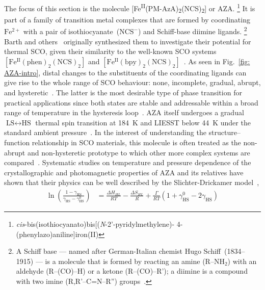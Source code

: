 The focus of this section is the molecule
[Fe\textsuperscript{II}(PM-AzA)\textsubscript{2}(NCS)\textsubscript{2}] or AZA.%
\footnote{\textit{cis}-bis(isothiocyanato)bis[(\textit{N}-2'-pyridylmethylene)-
4-(phenylazo)aniline]iron(II)}
It is part of a family of transition metal complexes
that are formed by coordinating $\mathrm{Fe^{2+}}$ with a pair of
isothiocyanate~($\mathrm{NCS^-}$) and Schiff-base diimine ligands.%
\footnote{A Schiff base --- named after German-Italian chemist Hugo Schiff~(1834--1915) ---
is a molecule that is formed by reacting an amine (R--NH$_2$) with an aldehyde (R--(CO)--H)
or a ketone (R--(CO)--R'); a diimine is a compound with two imine (R,R'--C=N--R'')
groups~\cite{Schiff1864, Halcrow2007}.}
%
Barth and others~\cite{Barth1972, Konig1974, Maeda1976} originally synthesized them
to investigate their potential for thermal SCO,
given their similarity to the well-known SCO systems $\mathrm{[Fe^{II}(phen)_2(NCS)_2]}$ and
$\mathrm{[Fe^{II}(bpy)_2(NCS)_2]}$~\cite{Baker1964}.
%
As seen in Fig.~\ref{fig: AZA-intro},
distal changes to the substituents of the coordinating ligands can give rise to
the whole range of SCO behaviour:
none, incomplete, gradual, abrupt, and hysteretic~\cite{Ksenofontov1998, Guionneau1999,
Letard1999, Capes2000}.
%
The latter is the most desirable type of phase transition for practical applications
since both states are stable and addressable within a broad range of temperature
in the hysteresis loop~\cite{Kahn1992, Kumar2017, Collet2018b}.
%
AZA itself undergoes a gradual $\text{LS} \leftrightarrow \text{HS}$ thermal spin transition
at 184~K and LIESST below 44~K under the standard ambient pressure~\cite{Letard1999, Capes2000}.
%
In the interest of understanding the structure--function relationship in SCO materials,
this molecule is often treated as the non-abrupt and non-hysteretic prototype
to which other more complex systems are compared~\cite{Boillot2002, Hayami2003,
Blundell2004, SCO-II, LeGrand2008, Kepenekian2009, Guionneau2012, Guionneau2014,
XZhang2015a, Mebs2015, Lakhloufi2016, Lakhloufi2018, Hamouda2018}.
%
Systematic studies on temperature and pressure dependence
of the crystallographic and photomagnetic properties of AZA and its relatives
have shown that their physics can be well described by the Slichter-Drickamer model~\cite{Slichter1972},
%
\begin{equation}
  \begin{aligned}
    \ln \left( \frac{1 - \gamma_\text{HS}}{\gamma_\text{HS} - \gamma_\text{HS}^0} \right)
      & = \frac{\Delta H_{HL}}{RT} - \frac{\Delta S_{HL}}{R}
        + \frac{\Gamma}{RT}\left( 1 + \gamma_\text{HS}^0 - 2 \gamma_\text{HS} \right)
    \label{eq: Slichter}
  \end{aligned}
\end{equation}
